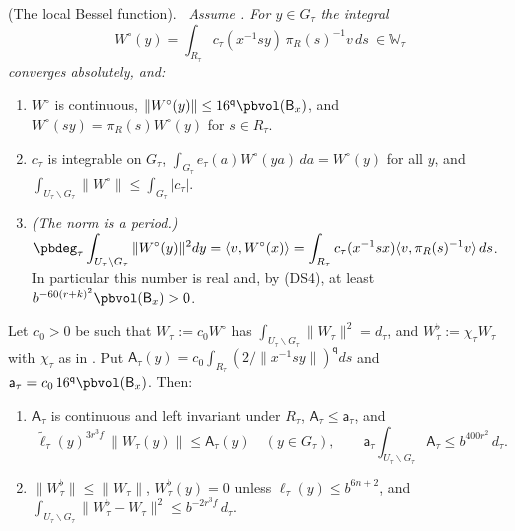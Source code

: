 \documentclass[10pt]{amsart}
\theoremstyle{definition}
\theoremstyle{remark}
\providecommand{\pbW}{\mathbb W}
\providecommand{\pbeB}{\mathsf B}
\providecommand{\pbel}{\ell}
\providecommand{\pbels}{\tilde\ell}
\providecommand{\pbeq}{\mathsf q}
\providecommand{\pbip}[2]{\langle#1,#2\rangle}
\newenvironment{quotedthm}[2]{\par\medskip\noindent\begingroup
  \textbf{#1}#2.\ \itshape\ignorespaces}{\endgroup\par\medskip}
\begin{document}
\begin{quotedthm}{\cite[Proposition~3.18]{P51}}{ (The local Bessel function)}
Assume {\cite[Theorem~3.16]{P51}}. For $y\in G_\tau$ the integral
\[
W^\circ(y)=\int_{R_\tau}c_\tau(x^{-1}sy)\,\pi_R(s)^{-1}v\,ds\ \in\pbW_\tau
\]
converges absolutely, and:
\begin{enumerate}
\item[(a)] $W^\circ$ is continuous, $\|W^\circ(y)\|\le16^{\pbeq}\pbvol(\pbeB_x)$, and $W^\circ(sy)=
\pi_R(s)W^\circ(y)$ for $s\in R_\tau$.
\item[(b)] $c_\tau$ is integrable on $G_\tau$, $\int_{G_\tau}e_\tau(a)W^\circ(ya)\,da=W^\circ(y)$ for
all $y$, and $\int_{U_\tau\backslash G_\tau}\|W^\circ\|\le\int_{G_\tau}|c_\tau|$.
\item[(c)] \emph{(The norm is a period.)} $\displaystyle\pbdeg_\tau\int_{U_\tau\backslash G_\tau}\|W^
\circ(y)\|^2dy=\pbip v{W^\circ(x)}=\int_{R_\tau}c_\tau(x^{-1}sx)\pbip v{\pi_R(s)^{-1}v}\,ds$. In
particular this number is real and, by \textup{(DS4)}, at least $b^{-60(r+k)^2}\pbvol(\pbeB_x)>0$.
\end{enumerate}
Let $c_0>0$ be such that $W_\tau:=c_0W^\circ$ has $\int_{U_\tau\backslash G_\tau}\|W_\tau\|^2=d_\tau$,
and $W_\tau^\flat:=\chi_\tau W_\tau$ with $\chi_\tau$ as in {\cite[(23)]{P51}}. Put
$\mathsf A_\tau(y)=c_0\int_{R_\tau}(2/\|x^{-1}sy\|)^{\pbeq}ds$ and $\mathsf a_\tau=c_0\,16^{\pbeq}\pbvol(
\pbeB_x)$. Then:
\begin{enumerate}
\item[(d)] $\mathsf A_\tau$ is continuous and left invariant under $R_\tau$, $\mathsf A_\tau\le\mathsf
a_\tau$, and
\[
\pbels_\tau(y)^{3r^3f}\,\|W_\tau(y)\|\le\mathsf A_\tau(y)\quad(y\in G_\tau),\qquad\mathsf a_\tau\int_{
U_\tau\backslash G_\tau}\mathsf A_\tau\le b^{400r^2}\,d_\tau .
\]
\item[(e)] $\|W^\flat_\tau\|\le\|W_\tau\|$, $W^\flat_\tau(y)=0$ unless $\pbel_\tau(y)\le b^{6n+2}$, and
$\displaystyle\int_{U_\tau\backslash G_\tau}\|W_\tau^\flat-W_\tau\|^2\le b^{-2r^3f}\,d_\tau$.
\end{enumerate}
\end{quotedthm}
\end{document}
